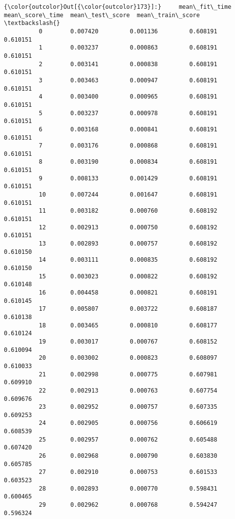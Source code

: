 \documentclass[11pt]{article}
\begin{document}
            \begin{Verbatim}[commandchars=\\\{\}]
{\color{outcolor}Out[{\color{outcolor}173}]:}     mean\_fit\_time  mean\_score\_time  mean\_test\_score  mean\_train\_score  \textbackslash{}
          0        0.007420         0.001136         0.608191          0.610151   
          1        0.003237         0.000863         0.608191          0.610151   
          2        0.003141         0.000838         0.608191          0.610151   
          3        0.003463         0.000947         0.608191          0.610151   
          4        0.003400         0.000965         0.608191          0.610151   
          5        0.003237         0.000978         0.608191          0.610151   
          6        0.003168         0.000841         0.608191          0.610151   
          7        0.003176         0.000868         0.608191          0.610151   
          8        0.003190         0.000834         0.608191          0.610151   
          9        0.008133         0.001429         0.608191          0.610151   
          10       0.007244         0.001647         0.608191          0.610151   
          11       0.003182         0.000760         0.608192          0.610151   
          12       0.002913         0.000750         0.608192          0.610151   
          13       0.002893         0.000757         0.608192          0.610150   
          14       0.003111         0.000835         0.608192          0.610150   
          15       0.003023         0.000822         0.608192          0.610148   
          16       0.004458         0.000821         0.608191          0.610145   
          17       0.005807         0.003722         0.608187          0.610138   
          18       0.003465         0.000810         0.608177          0.610124   
          19       0.003017         0.000767         0.608152          0.610094   
          20       0.003002         0.000823         0.608097          0.610033   
          21       0.002998         0.000775         0.607981          0.609910   
          22       0.002913         0.000763         0.607754          0.609676   
          23       0.002952         0.000757         0.607335          0.609253   
          24       0.002905         0.000756         0.606619          0.608539   
          25       0.002957         0.000762         0.605488          0.607420   
          26       0.002968         0.000790         0.603830          0.605785   
          27       0.002910         0.000753         0.601533          0.603523   
          28       0.002893         0.000770         0.598431          0.600465   
          29       0.002962         0.000768         0.594247          0.596324   
          

\end{Verbatim}
\end{document}
